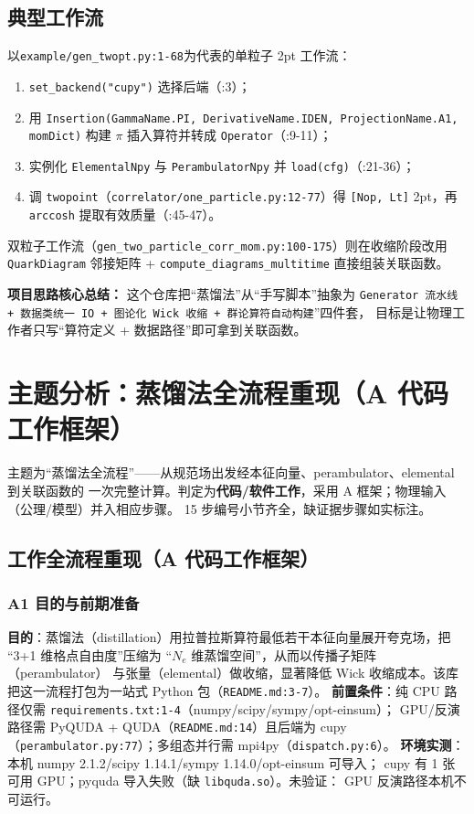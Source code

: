 \documentclass[UTF8]{ctexart}
\begin{document}
\subsection{典型工作流}
以\texttt{example/gen\_twopt.py:1-68}为代表的单粒子 2pt 工作流：
\begin{enumerate}
\item \texttt{set\_backend("cupy")} 选择后端（:3）；
\item 用 \texttt{Insertion(GammaName.PI, DerivativeName.IDEN, ProjectionName.A1, momDict)}
构建 $\pi$ 插入算符并转成 \texttt{Operator}（:9-11）；
\item 实例化 \texttt{ElementalNpy} 与 \texttt{PerambulatorNpy} 并 \texttt{load(cfg)}（:21-36）；
\item 调 \texttt{twopoint}（\texttt{correlator/one\_particle.py:12-77}）得
\texttt{[Nop, Lt]} 2pt，再 \texttt{arccosh} 提取有效质量（:45-47）。
\end{enumerate}
双粒子工作流（\texttt{gen\_two\_particle\_corr\_mom.py:100-175}）则在收缩阶段改用
\texttt{QuarkDiagram} 邻接矩阵 + \texttt{compute\_diagrams\_multitime} 直接组装关联函数。

\begin{ideabox}
\textbf{项目思路核心总结：} 这个仓库把``蒸馏法''从``手写脚本''抽象为
\texttt{Generator 流水线 + 数据类统一 IO + 图论化 Wick 收缩 + 群论算符自动构建}''四件套，
目标是让物理工作者只写``算符定义 + 数据路径''即可拿到关联函数。
\end{ideabox}

\section{主题分析：蒸馏法全流程重现（A 代码工作框架）}

主题为``蒸馏法全流程''——从规范场出发经本征向量、perambulator、elemental 到关联函数的
一次完整计算。判定为\textbf{代码/软件工作}，采用 A 框架；物理输入（公理/模型）并入相应步骤。
15 步编号小节齐全，缺证据步骤如实标注。

\subsection{工作全流程重现（A 代码工作框架）}

\subsubsection{A1 目的与前期准备}
\textbf{目的}：蒸馏法（distillation）用拉普拉斯算符最低若干本征向量展开夸克场，把
``3+1 维格点自由度''压缩为 ``$N_e$ 维蒸馏空间''，从而以传播子矩阵（perambulator）
与张量（elemental）做收缩，显著降低 Wick 收缩成本。该库把这一流程打包为一站式
Python 包（\texttt{README.md:3-7}）。
\textbf{前置条件}：纯 CPU 路径仅需 \texttt{requirements.txt:1-4}（numpy/scipy/sympy/opt-einsum）；
GPU/反演路径需 PyQUDA + QUDA（\texttt{README.md:14}）且后端为 cupy
（\texttt{perambulator.py:77}）；多组态并行需 mpi4py（\texttt{dispatch.py:6}）。
\textbf{环境实测}：本机 numpy 2.1.2/scipy 1.14.1/sympy 1.14.0/opt-einsum 可导入；
cupy 有 1 张可用 GPU；pyquda 导入失败（缺 \texttt{libquda.so}）。\textcolor{warn}{未验证}：
GPU 反演路径本机不可运行。
\end{document}
